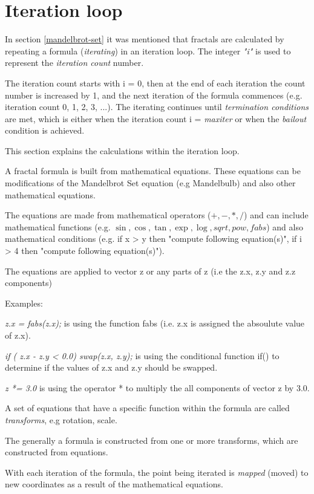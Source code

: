 \section{Iteration loop}\label{iteration-loop}

In section \ref{mandelbrot-set} it was mentioned that fractals are calculated
by repeating a formula (\emph{iterating}) in an iteration loop. 
The integer \emph{"i"} is used to represent the \emph{iteration count} number.

The iteration count starts with i = 0, then at the end of each iteration the
count number is increased by 1, and the next iteration of the formula commences 
(e.g. iteration count  0, 1, 2, 3, ...). The iterating continues until \emph{termination conditions} are met, 
which is either when the iteration count i =  \emph{maxiter} or when the \emph{bailout} condition is achieved. 

This section explains the calculations within the iteration loop.

A fractal formula is built from mathematical equations. 
These equations can be modifications of the Mandelbrot Set equation (e.g Mandelbulb) and also other mathematical equations.

The equations are made from mathematical operators ($+, -, *, /$) 
and can include mathematical functions (e.g. $\sin, \cos, \tan, \exp, \log, sqrt, pow, fabs$) 
and also mathematical conditions (e.g. if x > y then "compute following equation(s)", if i > 4 then "compute following equation(s)").

The equations are applied to vector z or any parts of z (i.e the z.x, z.y and z.z components)

Examples:

\emph{z.x = fabs(z.x);} is using the function fabs (i.e. z.x is assigned the absoulute value of z.x).

\emph{if ( z.x - z.y < 0.0) swap(z.x, z.y);} is using the conditional function if() to determine if the values of z.x and z.y should be swapped.

\emph{ z *= 3.0} is using the operator * to multiply the all components of vector z by 3.0.

A set of equations that have a specific function within the formula are called \emph{transforms}, e.g rotation, scale.

The generally a formula is constructed from one or more transforms, which are constructed from equations.

With each iteration of the formula, the point being iterated is \emph{mapped} (moved) to new coordinates as a result of the mathematical equations.  

